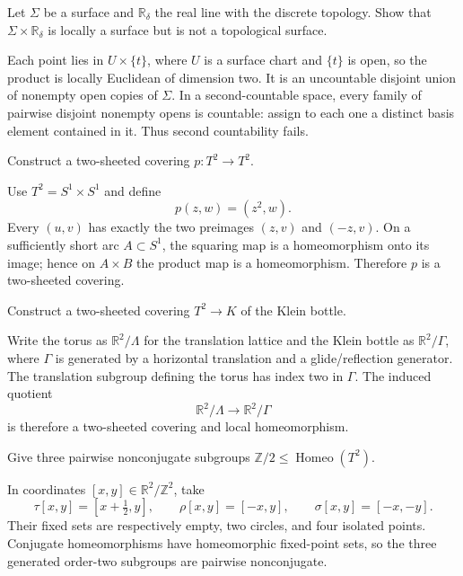 \begin{problem}\label{prob:vii01-03}
Let \(\Sigma\) be a surface and \(\mathbb R_\delta\) the real line with the discrete topology.  Show that \(\Sigma\times\mathbb R_\delta\) is locally a surface but is not a topological surface.
\end{problem}
\begin{solution}
Each point lies in \(U\times\{t\}\), where \(U\) is a surface chart and \(\{t\}\) is open, so the product is locally Euclidean of dimension two.  It is an uncountable disjoint union of nonempty open copies of \(\Sigma\).  In a second-countable space, every family of pairwise disjoint nonempty opens is countable: assign to each one a distinct basis element contained in it.  Thus second countability fails.
\end{solution}

\begin{problem}\label{prob:vii01-04}
Construct a two-sheeted covering \(p:T^2\to T^2\).
\end{problem}
\begin{solution}
Use \(T^2=S^1\times S^1\) and define
\[
p(z,w)=(z^2,w).
\]
Every \((u,v)\) has exactly the two preimages \((z,v)\) and \((-z,v)\).  On a sufficiently short arc \(A\subset S^1\), the squaring map is a homeomorphism onto its image; hence on \(A\times B\) the product map is a homeomorphism.  Therefore \(p\) is a two-sheeted covering.
\end{solution}

\begin{problem}\label{prob:vii01-05}
Construct a two-sheeted covering \(T^2\to K\) of the Klein bottle.
\end{problem}
\begin{solution}
Write the torus as \(\mathbb R^2/\Lambda\) for the translation lattice and the Klein bottle as \(\mathbb R^2/\Gamma\), where \(\Gamma\) is generated by a horizontal translation and a glide/reflection generator.  The translation subgroup defining the torus has index two in \(\Gamma\).  The induced quotient
\[
\mathbb R^2/\Lambda\longrightarrow\mathbb R^2/\Gamma
\]
is therefore a two-sheeted covering and local homeomorphism.
\end{solution}

\begin{problem}\label{prob:vii01-06}
Give three pairwise nonconjugate subgroups \(\mathbb Z/2\le\operatorname{Homeo}(T^2)\).
\end{problem}
\begin{solution}
In coordinates \([x,y]\in\mathbb R^2/\mathbb Z^2\), take
\[
\tau[x,y]=[x+\tfrac12,y],\qquad
\rho[x,y]=[-x,y],\qquad
\sigma[x,y]=[-x,-y].
\]
Their fixed sets are respectively empty, two circles, and four isolated points.  Conjugate homeomorphisms have homeomorphic fixed-point sets, so the three generated order-two subgroups are pairwise nonconjugate.
\end{solution}

